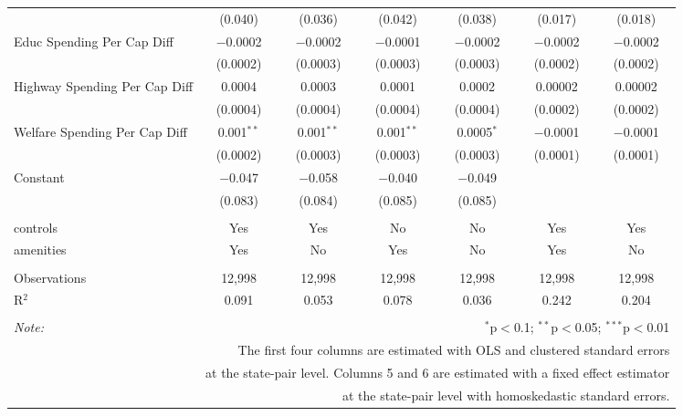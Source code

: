 \begin{table}[!htbp]
\begin{tabular}{@{\extracolsep{5pt}}lcccccc}
  & (0.040) & (0.036) & (0.042) & (0.038) & (0.017) & (0.018) \\ 
  Educ Spending Per Cap Diff & $-$0.0002 & $-$0.0002 & $-$0.0001 & $-$0.0002 & $-$0.0002 & $-$0.0002 \\ 
  & (0.0002) & (0.0003) & (0.0003) & (0.0003) & (0.0002) & (0.0002) \\ 
  Highway Spending Per Cap Diff & 0.0004 & 0.0003 & 0.0001 & 0.0002 & 0.00002 & 0.00002 \\ 
  & (0.0004) & (0.0004) & (0.0004) & (0.0004) & (0.0002) & (0.0002) \\ 
  Welfare Spending Per Cap Diff & 0.001$^{**}$ & 0.001$^{**}$ & 0.001$^{**}$ & 0.0005$^{*}$ & $-$0.0001 & $-$0.0001 \\ 
  & (0.0002) & (0.0003) & (0.0003) & (0.0003) & (0.0001) & (0.0001) \\ 
  Constant & $-$0.047 & $-$0.058 & $-$0.040 & $-$0.049 &  &  \\ 
  & (0.083) & (0.084) & (0.085) & (0.085) &  &  \\ 
 \hline \\[-1.8ex] 
controls & Yes & Yes & No & No & Yes & Yes \\ 
amenities & Yes & No & Yes & No & Yes & No \\ 
\hline \\[-1.8ex] 
Observations & 12,998 & 12,998 & 12,998 & 12,998 & 12,998 & 12,998 \\ 
R$^{2}$ & 0.091 & 0.053 & 0.078 & 0.036 & 0.242 & 0.204 \\ 
\hline 
\hline \\[-1.8ex] 
\textit{Note:}  & \multicolumn{6}{r}{$^{*}$p$<$0.1; $^{**}$p$<$0.05; $^{***}$p$<$0.01} \\ 
 & \multicolumn{6}{r}{The first four columns are estimated with OLS and clustered standard errors} \\ 
 & \multicolumn{6}{r}{at the state-pair level. Columns 5 and 6 are estimated with a fixed effect estimator} \\ 
 & \multicolumn{6}{r}{at the state-pair level with homoskedastic standard errors.} \\ 
\end{tabular} 
\end{table} 

